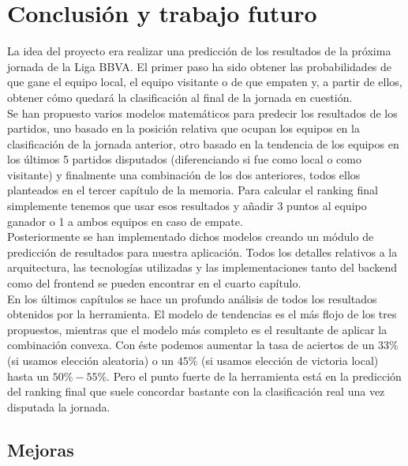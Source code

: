 \chapter{Conclusión y trabajo futuro}

La idea del proyecto era realizar una predicción de los resultados de la próxima jornada de la Liga BBVA. El primer paso ha sido obtener las probabilidades de que gane el equipo local, el equipo visitante o de que empaten y, a partir de ellos, obtener cómo quedará la clasificación al final de la jornada en cuestión.\\

Se han propuesto varios modelos matemáticos para predecir los resultados de los partidos, uno basado en la posición relativa que ocupan los equipos en la clasificación de la jornada anterior, otro basado en la tendencia de los equipos en los últimos 5 partidos disputados (diferenciando si fue como local o como visitante) y finalmente una combinación de los dos anteriores, todos ellos planteados en el tercer capítulo de la memoria. Para calcular el ranking final simplemente tenemos que usar esos resultados y añadir 3 puntos al equipo ganador o 1 a ambos equipos en caso de empate.\\
 
Posteriormente se han implementado dichos modelos creando un módulo de predicción de resultados para nuestra aplicación. Todos los detalles relativos a la arquitectura, las tecnologías utilizadas y las implementaciones tanto del backend como del frontend se pueden encontrar en el cuarto capítulo.\\  

En los últimos capítulos se hace un profundo análisis de todos los resultados obtenidos por la herramienta. El modelo de tendencias es el más flojo de los tres propuestos, mientras que el modelo más completo es el resultante de aplicar la combinación convexa. Con éste podemos aumentar la tasa de aciertos de un $33\%$ (si usamos elección aleatoria) o un $45\%$ (si usamos elección de victoria local) hasta un $50\%-55\%$. Pero el punto fuerte de la herramienta está en la predicción del ranking final que suele concordar bastante con la clasificación real una vez disputada la jornada.\\

\newpage

\section{Mejoras}

